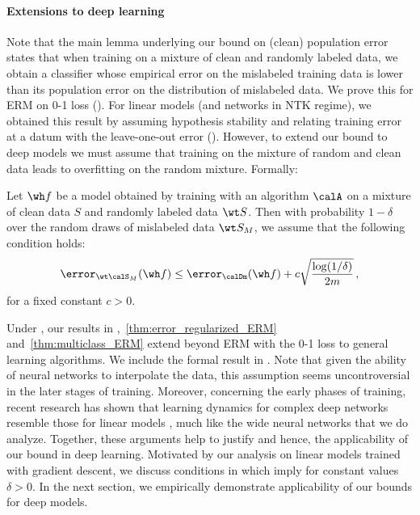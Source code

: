 \paragraph{Extensions to deep learning} 
Note that the main lemma underlying
our bound on (clean) population error  
states that when training on a
mixture of clean and randomly labeled data, 
we obtain a classifier whose empirical error 
on the mislabeled training data
is lower than its population error 
on the distribution of mislabeled data.  
We prove this for ERM on 0-1 loss (). 
For linear models 
(and networks in NTK regime), 
we obtained this result
by assuming hypothesis stability 
and relating training error at a datum
with the leave-one-out error (). 
However, to extend our bound to deep models 
we must assume that training 
on the mixture of random and clean data 
leads to overfitting on the random mixture. Formally:  

\begin{assumption} \label{asmp:deep_models}
Let $\wh f$ be a model obtained 
by training with an algorithm $\calA$ 
on a mixture of clean data $S$ 
and randomly labeled data $\wt S$. 
Then with probability $1-\delta$ 
over the random draws 
of mislabeled data $\wt S_M$, 
we assume that the following condition holds:
\begin{align*}
    \error_{\wt \calS_M} (\wh f) \le \error_{\calDm} (\wh f) + c\sqrt{\frac{\log(1/\delta)}{2m}}  \,,
\end{align*}
for a fixed constant $c > 0$.
\end{assumption}

Under , 
our results in ,~\ref{thm:error_regularized_ERM} and~\ref{thm:multiclass_ERM} 
extend beyond ERM with the 0-1 loss 
to general learning algorithms. 
We include the formal result in . 
% 
Note that given the ability of neural networks 
to interpolate the data, 
this assumption seems uncontroversial 
in the later stages of training. 
Moreover, concerning the early phases of training,
recent research has shown that 
learning dynamics for complex deep networks 
resemble those for linear models 
\citep{nakkiran2019sgd, hu2020surprising},
much like the wide neural networks 
that we do analyze.
Together, these arguments help 
to justify  and hence, the applicability
of our bound in deep learning.
Motivated by our analysis on linear models trained with gradient descent, 
we discuss conditions in  which imply  for constant values $\delta > 0$.
% 
% 
In the next section, we empirically demonstrate applicability of our bounds for deep models. 

